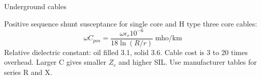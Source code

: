 Underground cables

Positive sequence shunt susceptance for single core and H type three core cables:
$$\omega C_{pos}=\frac{\omega\epsilon_r10^{-6}}{18\ln\left(R/r\right)}\;\text{mho/km}$$
Relative dielectric constant: oil filled 3.1, solid 3.6.
Cable cost is 3 to 20 times overhead. Larger C gives smaller $Z_c$ and higher SIL. Use manufacturer tables for series R and X.

